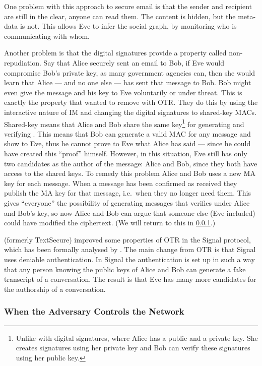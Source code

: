 One problem with this approach to secure email is that the sender and recipient
are still in the clear, anyone can read them.
The content is hidden, but the meta-data is not.
This allows Eve to infer the social graph, by monitoring who is communicating 
with whom.

Another problem is that the digital signatures provide a property called 
non-repudiation.
Say that Alice securely sent an email to Bob, if Eve would compromise Bob's 
private key, as many government agencies can, then she would learn that Alice 
--- and no one else --- has sent that message to Bob.
Bob might even give the message and his key to Eve voluntarily or under threat.
This is exactly the property that \citeauthor{otr2004} wanted to remove with 
\ac{OTR}.
They do this by using the interactive nature of \ac{IM} and changing the 
digital signatures to shared-key \acp{MAC}.
Shared-key means that Alice and Bob share the same key\footnote{%
  Unlike with digital signatures, where Alice has a public and a private key.
  She creates signatures using her private key and Bob can verify these 
  signatures using her public key.
} for generating and verifying .
This means that Bob can generate a valid \ac{MAC} for any message and show to 
Eve, thus he cannot prove to Eve what Alice has said --- since he could have 
created this \enquote{proof} himself.
However, in this situation, Eve still has only two candidates as the author of 
the message: Alice and Bob, since they both have access to the shared keys.
To remedy this problem Alice and Bob uses a new \ac{MA} key for each 
message.
When a message has been confirmed as received they publish the \ac{MA} key for 
that message, i.e.\ when they no longer need them.
This gives \enquote{everyone} the possibility of generating messages that 
verifies under Alice and Bob's key, so now Alice and Bob can argue that someone 
else (Eve included) could have modified the ciphertext.
(We will return to this in \cref{WhenAdversaryControlsNetwork}.)

\textcite{SignalApp} (formerly TextSecure) improved some properties of \ac{OTR} 
in the Signal protocol, which has been formally analysed by 
\textcite{TextSecureAnalysis,SignalProtocolAnalysis}.
The main change from \ac{OTR} is that Signal uses deniable authentication.
In Signal the authentication is set up in such a way that any person knowing 
the public keys of Alice and Bob can generate a fake transcript of 
a conversation.
The result is that Eve has many more candidates for the authorship of 
a conversation.

\subsubsection{When the Adversary Controls the Network}
\label{WhenAdversaryControlsNetwork}


